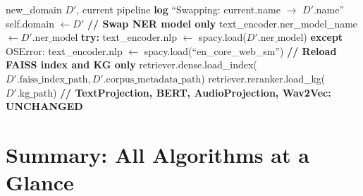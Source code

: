 \documentclass[12pt,a4paper]{article}
\theoremstyle{definition}
\theoremstyle{plain}
\theoremstyle{remark}
\begin{document}
\begin{algorithm}[H]
\caption{Domain Hot-Swap (swap\_domain)}
\label{alg:swap}
\begin{algorithmic}[1]
\Require new\_domain $D'$, current pipeline
\State \textbf{log} ``Swapping: current.name $\to$ $D'$.name''
\State self.domain $\gets D'$
\State \textbf{// Swap NER model only}
\State text\_encoder.ner\_model\_name $\gets D'.\text{ner\_model}$
\State \textbf{try:} text\_encoder.nlp $\gets$ spacy.load($D'.\text{ner\_model}$)
\State \textbf{except} OSError: text\_encoder.nlp $\gets$ spacy.load(``en\_core\_web\_sm'')
\State \textbf{// Reload FAISS index and KG only}
\State retriever.dense.load\_index($D'.\text{faiss\_index\_path}, D'.\text{corpus\_metadata\_path}$)
\State retriever.reranker.load\_kg($D'.\text{kg\_path}$)
\State \textbf{// TextProjection, BERT, AudioProjection, Wav2Vec: UNCHANGED}
\end{algorithmic}
\end{algorithm}

\newpage
\section{Summary: All Algorithms at a Glance}
\end{document}
